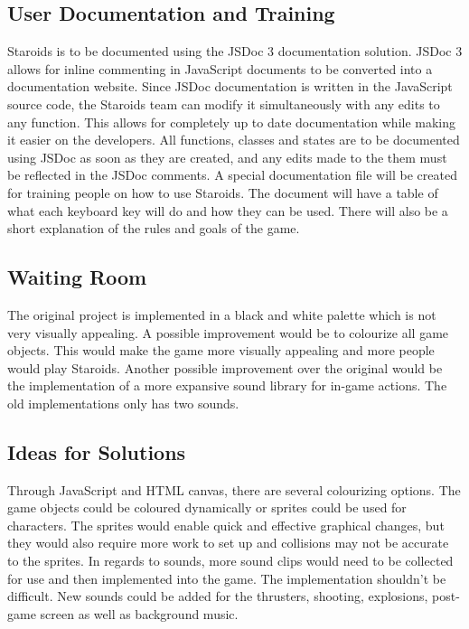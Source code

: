 \documentclass[12pt, titlepage]{article}
\begin{document}
\subsection{User Documentation and Training}
Staroids is to be documented using the JSDoc 3 documentation solution. JSDoc 3 allows for inline commenting in JavaScript documents to be converted into a documentation website. Since JSDoc documentation is written in the JavaScript source code, the Staroids team can modify it simultaneously with any edits to any function. This allows for completely up to date documentation while making it easier on the developers. All functions, classes and states are to be documented using JSDoc as soon as they are created, and any edits made to the them must be reflected in the JSDoc comments. A special documentation file will be created for training people on how to use Staroids. The document will have a table of what each keyboard key will do and how they can be used. There will also be a short explanation of the rules and goals of the game.\\

\subsection{Waiting Room}
The original project is implemented in a black and white palette which is not very visually appealing. A possible improvement would be to colourize all game objects. This would make the game more visually appealing and more people would play Staroids. Another possible improvement over the original would be the implementation of a more expansive sound library for in-game actions. The old implementations only has two sounds.\\

\subsection{Ideas for Solutions}
Through JavaScript and HTML canvas, there are several colourizing options. The game objects could be coloured dynamically or sprites could be used for characters. The sprites would enable quick and effective graphical changes, but they would also require more work to set up and collisions may not be accurate to the sprites. In regards to sounds, more sound clips would need to be collected for use and then implemented into the game. The implementation shouldn't be difficult. New sounds could be added for the thrusters, shooting, explosions, post-game screen as well as background music.\\
\end{document}
